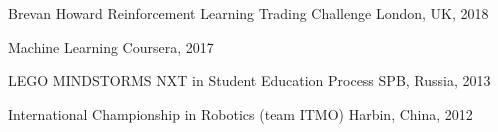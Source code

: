 

\begin{cvhonors}
            {Brevan Howard Reinforcement Learning Trading Challenge} %
            {London, UK, 2018} %
            {\faTrophy} %

            {Machine Learning} %
            {Coursera, 2017} %
            {\faAward} %

            {LEGO MINDSTORMS NXT in Student Education Process} %
            {SPB, Russia, 2013} %
            {\faAward} %

            {International Championship in Robotics (team ITMO)} %
            {Harbin, China, 2012} %
            {\faTrophy} %

\end{cvhonors}
